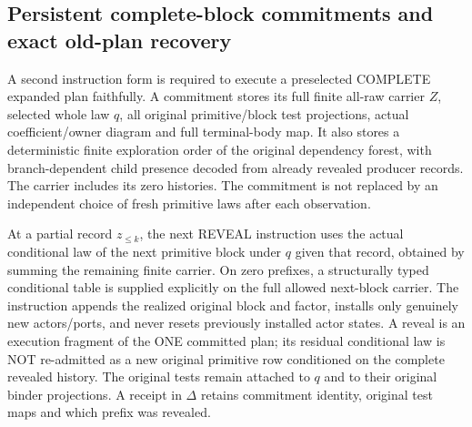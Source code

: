 \documentclass{article}
\begin{document}
\subsection{Persistent complete-block commitments and exact old-plan recovery}
A second instruction form is required to execute a preselected COMPLETE expanded plan faithfully. A commitment stores its full finite all-raw carrier $Z$, selected whole law $q$, all original primitive/block test projections, actual coefficient/owner diagram and full terminal-body map. It also stores a deterministic finite exploration order of the original dependency forest, with branch-dependent child presence decoded from already revealed producer records. The carrier includes its zero histories. The commitment is not replaced by an independent choice of fresh primitive laws after each observation.

At a partial record $z_{\le k}$, the next REVEAL instruction uses the actual conditional law of the next primitive block under $q$ given that record, obtained by summing the remaining finite carrier. On zero prefixes, a structurally typed conditional table is supplied explicitly on the full allowed next-block carrier. The instruction appends the realized original block and factor, installs only genuinely new actors/ports, and never resets previously installed actor states. A reveal is an execution fragment of the ONE committed plan; its residual conditional law is NOT re-admitted as a new original primitive row conditioned on the complete revealed history. The original tests remain attached to $q$ and to their original binder projections. A receipt in $\Delta$ retains commitment identity, original test maps and which prefix was revealed.
\end{document}
